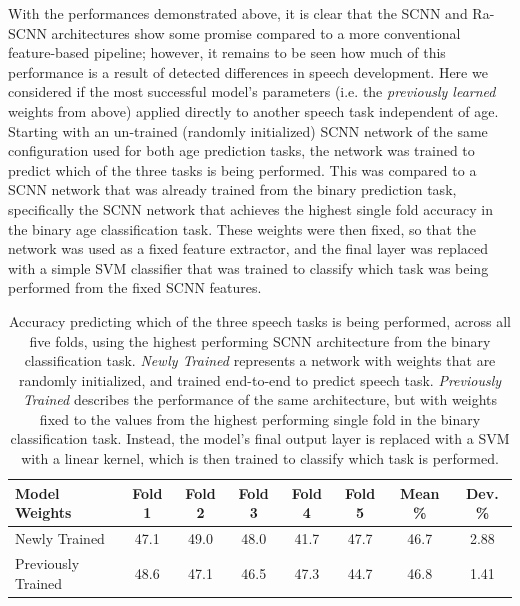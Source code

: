 \documentclass[fleqn,10pt]{wlscirep}
\begin{document}
With the performances demonstrated above, it is clear that the SCNN and Ra-SCNN architectures show some promise compared to a more conventional feature-based pipeline; however, it remains to be seen how much of this performance is a result of detected differences in speech development. Here we considered if the most successful model's parameters (i.e. the {\em previously learned} weights from above) applied directly to another speech task independent of age. Starting with an un-trained (randomly initialized) SCNN network of the same configuration used for both age prediction tasks, the network was trained to predict which of the three tasks is being performed. This was compared to a SCNN network that was already trained from the binary prediction task, specifically the SCNN network that achieves the highest single fold accuracy in the binary age classification task. These weights were then fixed, so that the network was used as a fixed feature extractor, and the final layer was replaced with a simple SVM classifier that was trained to classify which task was being performed from the fixed SCNN features.

\begin{table}[h]
 \caption{Accuracy predicting which of the three speech tasks is being performed, across all five folds, using the highest performing SCNN architecture from the binary classification task. \textit{Newly Trained} represents a network with weights that are randomly initialized, and trained end-to-end to predict speech task. \textit{Previously Trained} describes the performance of the same architecture, but with weights fixed to the values from the highest performing single fold in the binary classification task. Instead, the model's final output layer is replaced with a SVM with a linear kernel, which is then trained to classify which task is performed.}
 \centering
 \begin{tabular}{l | c | c | c | c | c | c | c}
   \toprule
   \textbf{Model Weights} & \textbf{Fold 1} & \textbf{Fold 2} & \textbf{Fold 3} & \textbf{Fold 4} & \textbf{Fold 5} & \textbf{Mean \%} & \textbf{Dev. \%}\\
   \toprule
                        Newly Trained           & 47.1 & 49.0 & 48.0 & 41.7 & 47.7 & 46.7 & 2.88 \\
   \midrule
                        Previously Trained      & 48.6 & 47.1 & 46.5 & 47.3 & 44.7 & 46.8 & 1.41 \\ 
   \bottomrule
 \end{tabular}
 \label{tab:task_results}
\end{table}
\end{document}
